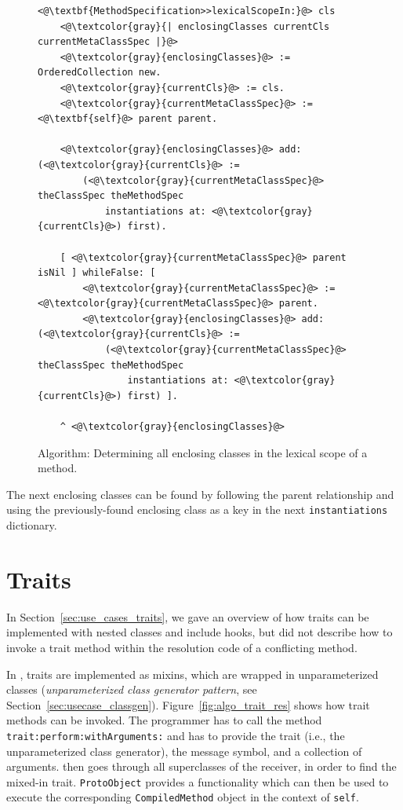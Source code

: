 \begin{figure}[!htp]
\begin{lstlisting}
<@\textbf{MethodSpecification>>lexicalScopeIn:}@> cls
    <@\textcolor{gray}{| enclosingClasses currentCls currentMetaClassSpec |}@>
    <@\textcolor{gray}{enclosingClasses}@> := OrderedCollection new.
    <@\textcolor{gray}{currentCls}@> := cls.
    <@\textcolor{gray}{currentMetaClassSpec}@> := <@\textbf{self}@> parent parent.

    <@\textcolor{gray}{enclosingClasses}@> add: (<@\textcolor{gray}{currentCls}@> := 
        (<@\textcolor{gray}{currentMetaClassSpec}@> theClassSpec theMethodSpec 
            instantiations at: <@\textcolor{gray}{currentCls}@>) first).

    [ <@\textcolor{gray}{currentMetaClassSpec}@> parent isNil ] whileFalse: [
        <@\textcolor{gray}{currentMetaClassSpec}@> := <@\textcolor{gray}{currentMetaClassSpec}@> parent.
        <@\textcolor{gray}{enclosingClasses}@> add: (<@\textcolor{gray}{currentCls}@> := 
            (<@\textcolor{gray}{currentMetaClassSpec}@> theClassSpec theMethodSpec 
                instantiations at: <@\textcolor{gray}{currentCls}@>) first) ].

    ^ <@\textcolor{gray}{enclosingClasses}@>
\end{lstlisting}
\caption[Algorithm: Determining the lexical scope of a method]{Algorithm: Determining all enclosing classes in the lexical scope of a method.}
\label{fig:app_det_lex_scope_algo}
\end{figure}

The next enclosing classes can be found by following the parent relationship and using the previously-found enclosing class as a key in the next \texttt{instantiations} dictionary.

\section{Traits}
\label{sec:app_traits}
In Section~\ref{sec:use_cases_traits}, we gave an overview of how traits can be implemented with nested classes and include hooks, but did not describe how to invoke a trait method within the resolution code of a conflicting method.

In \msname, traits are implemented as mixins, which are wrapped in unparameterized classes (\emph{unparameterized class generator pattern}, see Section~\ref{sec:usecase_classgen}). Figure~\ref{fig:algo_trait_res} shows how trait methods can be invoked. The programmer has to call the method \texttt{trait:perform:withArguments:} and has to provide the trait (i.e., the unparameterized class generator), the message symbol, and a collection of arguments. \msname then goes through all superclasses of the receiver, in order to find the mixed-in trait. \texttt{ProtoObject} provides a functionality which can then be used to execute the corresponding \texttt{CompiledMethod} object in the context of \texttt{self}.

